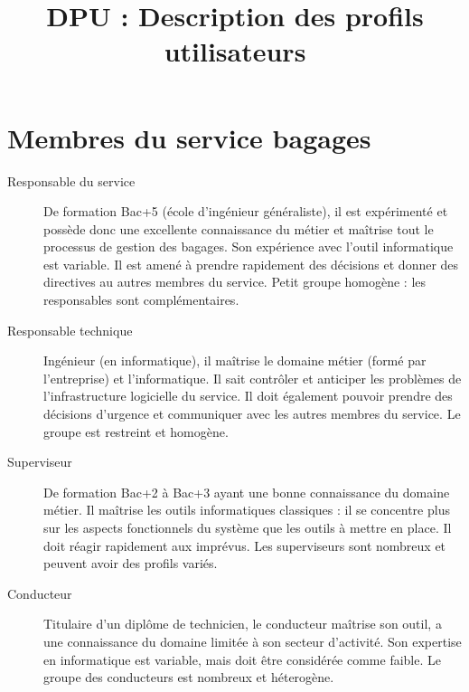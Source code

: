 

\title{DPU : Description des profils utilisateurs}


\maketitle

\section{Membres du service bagages}
\begin{description}
\item[Responsable du service] De formation Bac+5 (école d'ingénieur
généraliste), il est expérimenté et possède donc une excellente connaissance du
métier et maîtrise tout le processus de gestion des bagages. Son expérience avec
l'outil informatique est variable. Il est amené à prendre rapidement des
décisions et donner des directives au autres membres du service. Petit groupe
homogène : les responsables sont complémentaires.
\item[Responsable technique] Ingénieur (en informatique), il maîtrise le domaine
métier (formé par l'entreprise) et l'informatique. Il sait contrôler et
anticiper les problèmes de l'infrastructure logicielle du service. Il doit
également pouvoir prendre des décisions d'urgence et communiquer avec les autres
membres du service. Le groupe est restreint et homogène.
\item[Superviseur] De formation Bac+2 à Bac+3 ayant une bonne connaissance du
domaine métier. Il maîtrise les outils informatiques classiques : il se concentre plus
sur les aspects fonctionnels du système que les outils à mettre en place. Il
doit réagir rapidement aux imprévus. Les superviseurs sont nombreux et peuvent
avoir des profils variés.
\item[Conducteur] Titulaire d'un diplôme de technicien, le conducteur maîtrise
son outil, a une connaissance du domaine limitée à son secteur d'activité. Son
expertise en informatique est variable, mais doit être considérée comme faible.
Le groupe des conducteurs est nombreux et héterogène.
\end{description}

